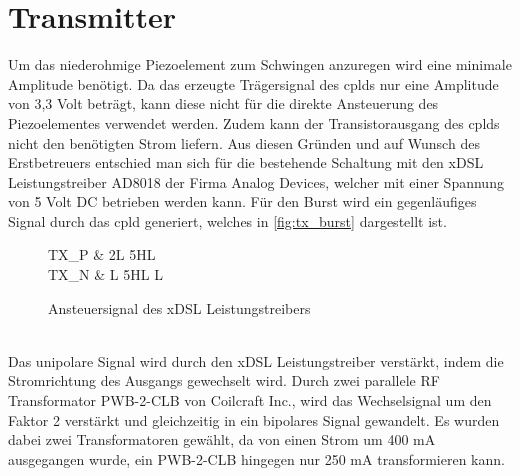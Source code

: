\section{Transmitter}\label{sec:transmitter}
Um das niederohmige Piezoelement zum Schwingen anzuregen wird eine minimale Amplitude benötigt. Da das erzeugte Trägersignal des \ac{cpld}s nur eine Amplitude von 3,3 Volt beträgt, kann diese nicht für die direkte Ansteuerung des Piezoelementes verwendet werden. Zudem kann der Transistorausgang des \ac{cpld}s nicht den benötigten Strom liefern. Aus diesen Gründen und auf Wunsch des Erstbetreuers entschied man sich für die bestehende Schaltung mit den xDSL Leistungstreiber AD8018 der Firma Analog Devices\cite{ad8018}, welcher mit einer Spannung von 5 Volt DC betrieben werden kann. Für den Burst wird ein gegenläufiges Signal durch das \ac{cpld} generiert, welches in \autoref{fig:tx_burst} dargestellt ist.
\begin{figure}[ht!]
	\centering
   \begin{tikztimingtable}[timing/d/background/.style={fill=white},
   timing/lslope=0.2]
	 		TX\_P & 2L 5{HL}  \\
	 		TX\_N & L 5{HL} L  \\
\end{tikztimingtable}
	\caption{Ansteuersignal des xDSL Leistungstreibers}
   \label{fig:tx_burst}
\end{figure}\\
Das unipolare Signal wird durch den xDSL Leistungstreiber verstärkt, indem die Stromrichtung des Ausgangs gewechselt wird. Durch zwei parallele RF Transformator PWB-2-CLB von Coilcraft Inc.\cite{rfwandler}, wird das Wechselsignal um den Faktor 2 verstärkt und gleichzeitig in ein bipolares Signal gewandelt. Es wurden dabei zwei Transformatoren gewählt, da von einen Strom um 400 mA ausgegangen wurde, ein PWB-2-CLB hingegen nur 250 mA transformieren kann.

